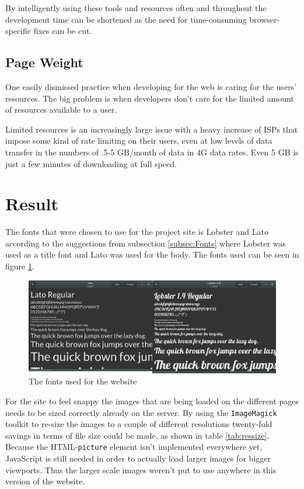 \documentclass[a4paper]{scrartcl}
\begin{document}
By intelligently using these tools and resources often and throughout the development time can be shortened as the need for time-consuming browser-specific fixes can be cut.

\subsection{Page Weight}
\label{subsec:PageWeight}

One easily dismissed practice when developing for the web is caring for the users' resources. The big problem is when developers don't care for the limited amount of resources available to a user.

Limited resources is an increasingly large issue with a heavy increase of ISPs that impose some kind of rate limiting on their users, even at low levels of data transfer in the numbers of .5-5 GB/month of data in 4G data rates. Even 5 GB is just a few minutes of downloading at full speed.

\section{Result}

The fonts that were chosen to use for the project site is Lobster and Lato according to the suggestions from subsection \ref{subsec:Fonts} where Lobster was used as a title font and Lato was used for the body. The fonts used can be seen in figure \ref{fig:fonts}.

\begin{figure}[h]
  \begin{center}
    \includegraphics[scale=0.3]{fonts.png}
    \caption{The fonts used for the website}
    \label{fig:fonts}
  \end{center}
\end{figure}

For the site to feel snappy the images that are being loaded on the different pages needs to be sized correctly already on the server. By using the \texttt{ImageMagick} toolkit to re-size the images to a couple of different resolutions twenty-fold savings in terms of file size could be made, as shown in table \ref{tab:ressize}. Because the HTML-\texttt{picture} element isn't implemented everywhere yet, JavaScript is still needed in order to actually load larger images for bigger viewports. Thus the larger scale images weren't put to use anywhere in this version of the website.
\end{document}
